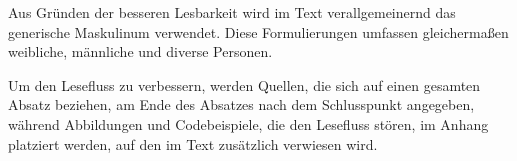 \documentclass[../main.tex]{subfiles}
\begin{document}
Aus Gründen der besseren Lesbarkeit wird im Text verallgemeinernd das generische Maskulinum verwendet. Diese Formulierungen umfassen gleichermaßen weibliche, männliche und diverse Personen.

Um den Lesefluss zu verbessern, werden Quellen, die sich auf einen gesamten Absatz beziehen, am Ende des Absatzes nach dem Schlusspunkt angegeben, während Abbildungen und Codebeispiele, die den
Lesefluss stören, im Anhang platziert werden, auf den im Text zusätzlich verwiesen wird. 
\end{document}
